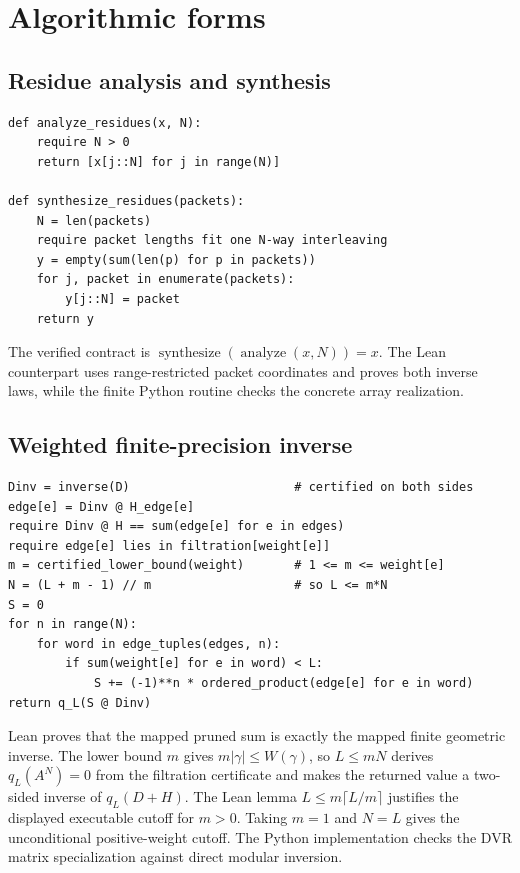 \documentclass[11pt,a4paper]{article}
\theoremstyle{definition}
\theoremstyle{remark}
\theoremstyle{definition}\newtheorem{construction}[theorem]{Construction}\newtheorem{certificate}[theorem]{Numerical Certificate}
\theoremstyle{remark}\newtheorem{boundary}[theorem]{Boundary}
\begin{document}
\section{Algorithmic forms}\label{sec:algorithms}

\subsection{Residue analysis and synthesis}\label{alg:residue}

\begin{lstlisting}
def analyze_residues(x, N):
    require N > 0
    return [x[j::N] for j in range(N)]

def synthesize_residues(packets):
    N = len(packets)
    require packet lengths fit one N-way interleaving
    y = empty(sum(len(p) for p in packets))
    for j, packet in enumerate(packets):
        y[j::N] = packet
    return y
\end{lstlisting}

The verified contract is
$\operatorname{synthesize}(\operatorname{analyze}(x,N))=x$. The Lean
counterpart uses range-restricted packet coordinates and proves both inverse
laws, while the finite Python routine checks the concrete array realization.

\subsection{Weighted finite-precision inverse}\label{alg:weighted-inverse}

\begin{lstlisting}
Dinv = inverse(D)                       # certified on both sides
edge[e] = Dinv @ H_edge[e]
require Dinv @ H == sum(edge[e] for e in edges)
require edge[e] lies in filtration[weight[e]]
m = certified_lower_bound(weight)       # 1 <= m <= weight[e]
N = (L + m - 1) // m                    # so L <= m*N
S = 0
for n in range(N):
    for word in edge_tuples(edges, n):
        if sum(weight[e] for e in word) < L:
            S += (-1)**n * ordered_product(edge[e] for e in word)
return q_L(S @ Dinv)
\end{lstlisting}

Lean proves that the mapped pruned sum is exactly the mapped finite geometric
inverse. The lower bound $m$ gives $m|\gamma|\le W(\gamma)$, so
$L\le mN$ derives $q_L(A^N)=0$ from the filtration certificate and makes the
returned value a two-sided inverse of $q_L(D+H)$. The Lean lemma
$L\le m\lceil L/m\rceil$ justifies the displayed executable cutoff for
$m>0$. Taking $m=1$ and $N=L$ gives
the unconditional positive-weight cutoff. The Python implementation checks the
DVR matrix specialization against direct modular inversion.
\end{document}
